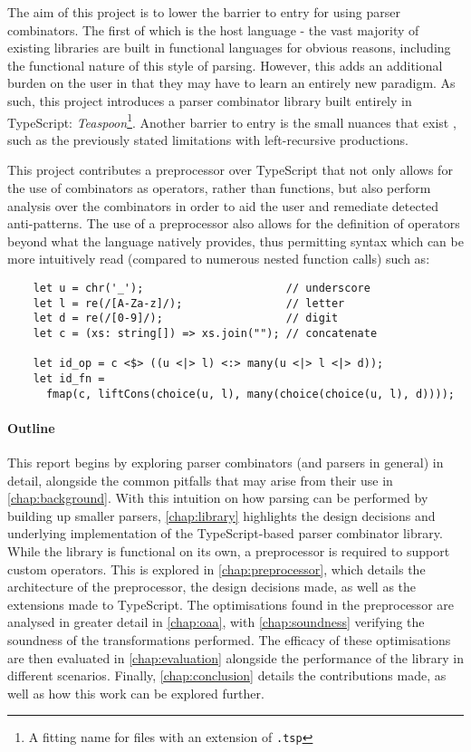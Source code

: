 The aim of this project is to lower the barrier to entry for using parser combinators.
The first of which is the host language - the vast majority of existing libraries are built in functional languages for obvious reasons, including the functional nature of this style of parsing.
However, this adds an additional burden on the user in that they may have to learn an entirely new paradigm.
As such, this project introduces a parser combinator library built entirely in TypeScript: \textit{Teaspoon}\footnote{A fitting name for files with an extension of \texttt{.tsp}}.
Another barrier to entry is the small nuances that exist \cite{willis21}, such as the previously stated limitations with left-recursive productions.

This project contributes a preprocessor over TypeScript that not only allows for the use of combinators as operators, rather than functions, but also perform analysis over the combinators in order to aid the user and remediate detected anti-patterns.
The use of a preprocessor also allows for the definition of operators beyond what the language natively provides, thus permitting syntax which can be more intuitively read (compared to numerous nested function calls) such as:

\begin{verbatim}
    let u = chr('_');                      // underscore
    let l = re(/[A-Za-z]/);                // letter
    let d = re(/[0-9]/);                   // digit
    let c = (xs: string[]) => xs.join(""); // concatenate

    let id_op = c <$> ((u <|> l) <:> many(u <|> l <|> d));
    let id_fn =
      fmap(c, liftCons(choice(u, l), many(choice(choice(u, l), d))));
\end{verbatim}

\paragraph*{Outline}
This report begins by exploring parser combinators (and parsers in general) in detail, alongside the common pitfalls that may arise from their use in \autoref{chap:background}.
With this intuition on how parsing can be performed by building up smaller parsers, \autoref{chap:library} highlights the design decisions and underlying implementation of the TypeScript-based parser combinator library.
While the library is functional on its own, a preprocessor is required to support custom operators.
This is explored in \autoref{chap:preprocessor}, which details the architecture of the preprocessor, the design decisions made, as well as the extensions made to TypeScript.
The optimisations found in the preprocessor are analysed in greater detail in \autoref{chap:oaa}, with \autoref{chap:soundness} verifying the soundness of the transformations performed.
The efficacy of these optimisations are then evaluated in \autoref{chap:evaluation} alongside the performance of the library in different scenarios.
Finally, \autoref{chap:conclusion} details the contributions made, as well as how this work can be explored further.
